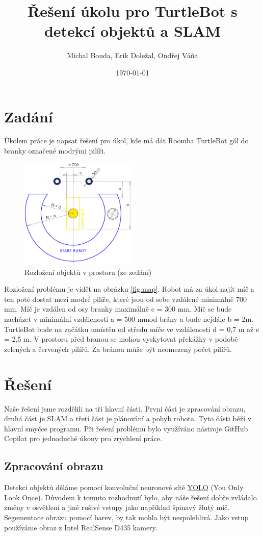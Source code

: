 \documentclass[a4paper,12pt]{article}
\title{Řešení úkolu pro TurtleBot s detekcí objektů a SLAM}
\author{Michal Bouda, Erik Doležal, Ondřej Váňa}
\date{\today}
\begin{document}
\maketitle

\tableofcontents

\section{Zadání}
Úkolem práce je napsat řešení pro úkol, kde má dát Roomba TurtleBot gól do branky označené modrými pilíři.
\begin{figure}[H]
    \centering
    \includegraphics[width=0.5\textwidth]{pictures/map.png}
    \caption{Rozložení objektů v prostoru (ze zedání)}
    \label{fig:map}	
\end{figure}
Rozložení problému je vidět na obrázku \eqref{fig:map}. Robot má za úkol najít míč a ten poté dostat mezi modré pilíře, které jsou od sebe vzdálené minimálně 700 mm. Míč je vzdálen od osy branky maximálně c = 300 mm.
Míč se bude nacházet v minimální vzdálenosti a = 500 mmod brány a bude nejdále b = 2m. TurtleBot bude na začátku umístěn od středu míče ve vzdálenosti d = 0,7 m až e = 2,5 m.
V prostoru před branou se mohou vyskytovat překážky v podobě zelených a červených pilířů. Za bránou může být neomezený počet pilířů.

\section{Řešení}
Naše řešení jsme rozdělili na tři hlavní části. První část je zpracování obrazu, druhá část je SLAM a třetí část je plánování a pohyb robota. Tyto části běží v hlavní smyčce programu. Při řešení problému bylo využíváno nástroje GitHub Copilat pro jednoduché úkony pro zrychlení práce.
\subsection{Zpracování obrazu}
Detekci objektů děláme pomocí konvoluční neuronové sítě \href{https://docs.ultralytics.com/models/}{YOLO} (You Only Look Once). Důvodem k tomuto rozhodnutí bylo, aby náše řešení dobře zvládalo změny v osvětlení a jiné rušivé vstupy jako například špinavý žlutý míč. Segementace obrazu pomocí barev, by tak mohla být nespolehlivá. Jako vstup používáme obraz z Intel RealSense D435 kamery.
\end{document}
